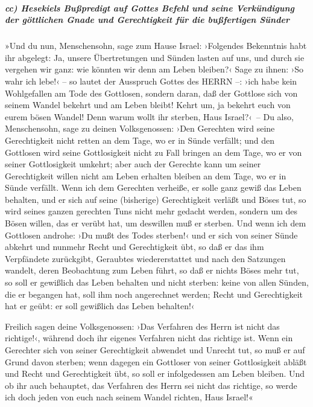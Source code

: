 \hypertarget{cc-hesekiels-buuxdfpredigt-auf-gottes-befehl-und-seine-verkuxfcndigung-der-guxf6ttlichen-gnade-und-gerechtigkeit-fuxfcr-die-buuxdffertigen-suxfcnder}{%
\subparagraph{cc) Hesekiels Bußpredigt auf Gottes Befehl und seine
Verkündigung der göttlichen Gnade und Gerechtigkeit für die bußfertigen
Sünder}\label{cc-hesekiels-buuxdfpredigt-auf-gottes-befehl-und-seine-verkuxfcndigung-der-guxf6ttlichen-gnade-und-gerechtigkeit-fuxfcr-die-buuxdffertigen-suxfcnder}}

»Und du nun, Menschensohn, sage zum Hause Israel:
›Folgendes Bekenntnis habt ihr abgelegt: Ja, unsere Übertretungen und
Sünden lasten auf uns, und durch sie vergehen wir ganz: wie könnten wir
denn am Leben bleiben?‹ Sage zu ihnen: ›So wahr ich
lebe!‹ -- so lautet der Ausspruch Gottes des HERRN --: ›ich habe kein
Wohlgefallen am Tode des Gottlosen, sondern daran, daß der Gottlose sich
von seinem Wandel bekehrt und am Leben bleibt! Kehrt um, ja bekehrt euch
von eurem bösen Wandel! Denn warum wollt ihr sterben, Haus Israel?‹~--
Du also, Menschensohn, sage zu deinen Volksgenossen: ›Den
Gerechten wird seine Gerechtigkeit nicht retten an dem Tage, wo er in
Sünde verfällt; und den Gottlosen wird seine Gottlosigkeit nicht zu Fall
bringen an dem Tage, wo er von seiner Gottlosigkeit umkehrt; aber auch
der Gerechte kann um seiner Gerechtigkeit willen nicht am Leben erhalten
bleiben an dem Tage, wo er in Sünde verfällt. Wenn ich
dem Gerechten verheiße, er solle ganz gewiß das Leben behalten, und er
sich auf seine (bisherige) Gerechtigkeit verläßt und Böses tut, so wird
seines ganzen gerechten Tuns nicht mehr gedacht werden, sondern um des
Bösen willen, das er verübt hat, um deswillen muß er sterben.
Und wenn ich dem Gottlosen androhe: ›Du mußt des Todes
sterben!‹ und er sich von seiner Sünde abkehrt und nunmehr Recht und
Gerechtigkeit übt, so daß er das ihm Verpfändete zurückgibt, Geraubtes
wiedererstattet und nach den Satzungen wandelt, deren Beobachtung zum
Leben führt, so daß er nichts Böses mehr tut, so soll er gewißlich das
Leben behalten und nicht sterben:  keine
von allen Sünden, die er begangen hat, soll ihm noch angerechnet werden;
Recht und Gerechtigkeit hat er geübt: er soll gewißlich das Leben
behalten!‹

Freilich sagen deine Volksgenossen: ›Das Verfahren des
Herrn ist nicht das richtige!‹, während doch ihr eigenes Verfahren nicht
das richtige ist. Wenn ein Gerechter sich von seiner
Gerechtigkeit abwendet und Unrecht tut, so muß er auf Grund davon
sterben; wenn dagegen ein Gottloser von seiner
Gottlosigkeit abläßt und Recht und Gerechtigkeit übt, so soll er
infolgedessen am Leben bleiben. Und ob ihr auch
behauptet, das Verfahren des Herrn sei nicht das richtige, so werde ich
doch jeden von euch nach seinem Wandel richten, Haus Israel!«

